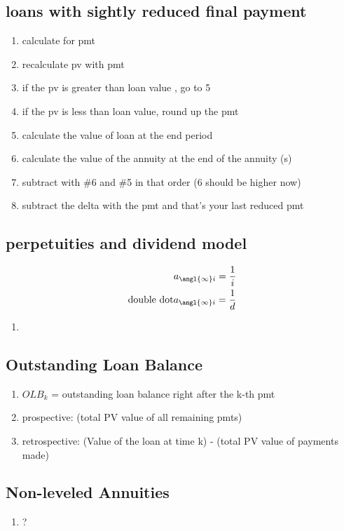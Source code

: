 \documentclass[12pt]{article}
\begin{document}
\subsection{loans with sightly reduced final payment}
\begin{enumerate}
	\item calculate for pmt
	\item recalculate pv with pmt
	\item if the pv is greater than loan value , go to 5
	\item if the pv is less than loan value, round up the pmt
	\item calculate the value of loan at the end period
	\item calculate the value of the annuity at the end of the annuity (s)
	\item subtract with \#6 and \#5 in that order (6 should be higher now)
	\item subtract the delta with the pmt and that's your last reduced pmt
\end{enumerate}
\subsection{perpetuities and dividend model}
\begin{align}
	a_{\angl{\infty}i} = \frac{1}{i} \nonumber \\
	 \text{double dot} a_{\angl{\infty}i} = \frac{1}{d} \nonumber
\end{align}
\begin{enumerate}
	\item 
\end{enumerate}

\subsection{Outstanding Loan Balance}
\begin{enumerate}
	\item $OLB_k$ = outstanding loan balance right after the k-th pmt
	\item prospective: (total PV value of all remaining pmts)
	\item retrospective: (Value of the loan at time k) - (total PV value of payments made)
\end{enumerate}
\subsection{Non-leveled Annuities}
\begin{enumerate}
	\item ?
\end{enumerate}
\end{document}
